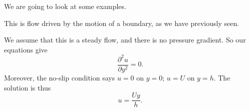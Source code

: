 \documentclass[a4paper]{article}
\begin{document}
We are going to look at some examples.
\begin{eg}
  This is flow driven by the motion of a boundary, as we have previously seen.
  \begin{center}
  \end{center}
  We assume that this is a steady flow, and there is no pressure gradient. So our equations give
  \[
    \frac{\partial^2 u}{\partial y^2} = 0.
  \]
  Moreover, the no-slip condition says $u = 0$ on $y = 0$; $u = U$ on $y = h$. The solution is thus
  \[
    u = \frac{U y}{h}.
  \]
\end{eg}
\end{document}
